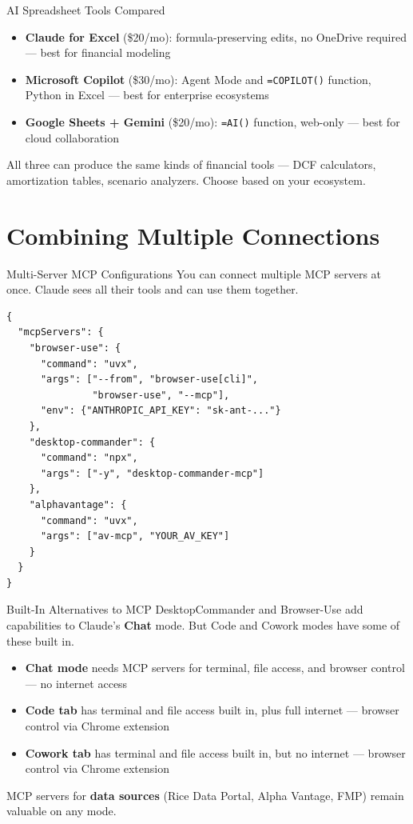 \documentclass[aspectratio=169]{beamer}
\begin{document}
\begin{frame}{AI Spreadsheet Tools Compared}
\begin{itemize}
  \item \textbf{Claude for Excel} (\$20/mo): formula-preserving edits, no OneDrive required --- best for financial modeling
  \item \textbf{Microsoft Copilot} (\$30/mo): Agent Mode and \texttt{=COPILOT()} function, Python in Excel --- best for enterprise ecosystems
  \item \textbf{Google Sheets + Gemini} (\$20/mo): \texttt{=AI()} function, web-only --- best for cloud collaboration
\end{itemize}
\vspace{0.3cm}
All three can produce the same kinds of financial tools --- DCF calculators, amortization tables, scenario analyzers.  Choose based on your ecosystem.
\end{frame}

\section{Combining Multiple Connections}

\begin{frame}[fragile,shrink=10]{Multi-Server MCP Configurations}
You can connect multiple MCP servers at once. Claude sees all their tools and can use them together.
\vspace{0.2cm}
\begin{verbatim}
{
  "mcpServers": {
    "browser-use": {
      "command": "uvx",
      "args": ["--from", "browser-use[cli]",
               "browser-use", "--mcp"],
      "env": {"ANTHROPIC_API_KEY": "sk-ant-..."}
    },
    "desktop-commander": {
      "command": "npx",
      "args": ["-y", "desktop-commander-mcp"]
    },
    "alphavantage": {
      "command": "uvx",
      "args": ["av-mcp", "YOUR_AV_KEY"]
    }
  }
}
\end{verbatim}
\end{frame}

\begin{frame}{Built-In Alternatives to MCP}
DesktopCommander and Browser-Use add capabilities to Claude's \textbf{Chat} mode. But Code and Cowork modes have some of these built in.
\vspace{0.3cm}
\begin{itemize}
  \item \textbf{Chat mode} needs MCP servers for terminal, file access, and browser control --- no internet access
  \item \textbf{Code tab} has terminal and file access built in, plus full internet --- browser control via Chrome extension
  \item \textbf{Cowork tab} has terminal and file access built in, but no internet --- browser control via Chrome extension
\end{itemize}
\vspace{0.3cm}
MCP servers for \textbf{data sources} (Rice Data Portal, Alpha Vantage, FMP) remain valuable on any mode.
\end{frame}
\end{document}
